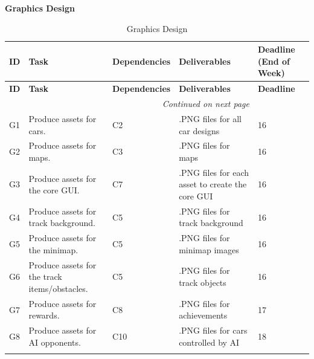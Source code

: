 \documentclass[12pt]{article}
\begin{document}
\endgroup


\noindent\textbf{Graphics Design}

\setlength{\LTpre}{6pt}
\setlength{\LTpost}{6pt}

\begingroup
\setlength{\parindent}{0pt}

\setlength{\widenby}{45mm} %

\setlength{\LTleft}{-0.5\widenby}
\setlength{\LTright}{-0.5\widenby}

\noindent\begin{longtable}{|l|p{}|p{}|p{}|p{}|}
\hline
\textbf{ID} & \textbf{Task} & \textbf{Dependencies} & \textbf{Deliverables} & \textbf{Deadline (End of Week)} \\
\hline
\endfirsthead

\hline
\textbf{ID} & \textbf{Task} & \textbf{Dependencies} & \textbf{Deliverables} & \textbf{Deadline} \\
\hline
\endhead

\hline
\multicolumn{4}{r}{\small\textit{Continued on next page}} \\
\endfoot

\hline
\endlastfoot

G1 & Produce assets for cars. & C2 & .PNG files for all car designs & 16 \\
\hline
G2 & Produce assets for maps. & C3 & .PNG files for maps & 16 \\
\hline
G3 & Produce assets for the core GUI. & C7 & .PNG files for each asset to create the core GUI & 16 \\
\hline
G4 & Produce assets for track background. & C5 & .PNG files for track background & 16 \\
\hline
G5 & Produce assets for the minimap. & C5 & .PNG files for minimap images & 16 \\
\hline
G6 & Produce assets for the track items/obstacles. & C5 & .PNG files for track objects & 16 \\
\hline
G7 & Produce assets for rewards. & C8 & .PNG files for achievements & 17 \\
\hline
G8 & Produce assets for AI opponents. & C10 & .PNG files for cars controlled by AI & 18 \\
\hline

\caption{Graphics Design}
\end{longtable}
\end{document}
